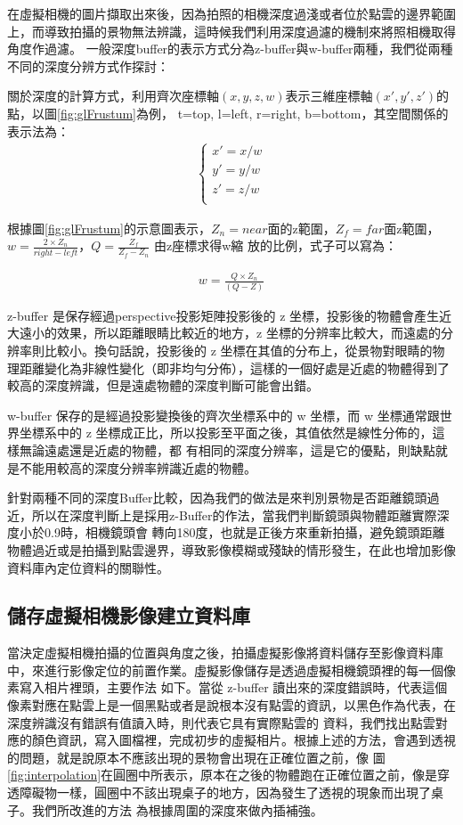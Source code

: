 	在虛擬相機的圖片擷取出來後，因為拍照的相機深度過淺或者位於點雲的邊界範圍上，而導致拍攝的景物無法辨識，這時候我們利用深度過濾的機制來將照相機取得角度作過濾。
	一般深度buffer的表示方式分為z-buffer與w-buffer兩種，我們從兩種不同的深度分辨方式作探討：
	
	關於深度的計算方式，利用齊次座標軸$(x,y,z,w)$表示三維座標軸$(x',y',z')$的點，以圖\ref{fig:glFrustum}為例，
	t=top, l=left, r=right, b=bottom，其空間關係的表示法為：
	\begin{align}
		\left\{
		\begin{array}{ccc}
		x' = x /w \\
		y' = y /w \\
		z' = z /w \\
		\end{array}
		\right.
	\end{align}
	
	根據圖\ref{fig:glFrustum}的示意圖表示，$Z_n = near$面的z範圍，$Z_f = far$面z範圍，$w = \frac{2 \times Z_n}{right-left}$，$Q = \frac{Z_f}{Z_f - Z_n}$ 由z座標求得w縮
	放的比例，式子可以寫為：
		
	\begin{align}
		w = \frac{Q\times Z_n}{(Q-Z)}
	\end{align}			
	
	z-buffer 是保存經過perspective投影矩陣投影後的 z 坐標，投影後的物體會產生近大遠小的效果，所以距離眼睛比較近的地方，z 坐標的分辨率比較大，而遠處的分辨率則比較小。換句話說，投影後的
    z 坐標在其值的分布上，從景物對眼睛的物理距離變化為非線性變化（即非均勻分佈），這樣的一個好處是近處的物體得到了較高的深度辨識，但是遠處物體的深度判斷可能會出錯。 
    
    w-buffer 保存的是經過投影變換後的齊次坐標系中的 w 坐標，而 w 坐標通常跟世界坐標系中的 z 坐標成正比，所以投影至平面之後，其值依然是線性分佈的，這樣無論遠處還是近處的物體，都
    有相同的深度分辨率，這是它的優點，則缺點就是不能用較高的深度分辨率辨識近處的物體。
    
    針對兩種不同的深度Buffer比較，因為我們的做法是來判別景物是否距離鏡頭過近，所以在深度判斷上是採用z-Buffer的作法，當我們判斷鏡頭與物體距離實際深度小於0.9時，相機鏡頭會
    轉向180度，也就是正後方來重新拍攝，避免鏡頭距離物體過近或是拍攝到點雲邊界，導致影像模糊或殘缺的情形發生，在此也增加影像資料庫內定位資料的關聯性。

\subsection{儲存虛擬相機影像建立資料庫}
%
	當決定虛擬相機拍攝的位置與角度之後，拍攝虛擬影像將資料儲存至影像資料庫中，來進行影像定位的前置作業。虛擬影像儲存是透過虛擬相機鏡頭裡的每一個像素寫入相片裡頭，主要作法
	如下。當從 z-buffer 讀出來的深度錯誤時，代表這個像素對應在點雲上是一個黑點或者是說根本沒有點雲的資訊，以黑色作為代表，在深度辨識沒有錯誤有值讀入時，則代表它具有實際點雲的
	資料，我們找出點雲對應的顏色資訊，寫入圖檔裡，完成初步的虛擬相片。根據上述的方法，會遇到透視的問題，就是說原本不應該出現的景物會出現在正確位置之前，像
	圖\ref{fig:interpolation}在圓圈中所表示，原本在之後的物體跑在正確位置之前，像是穿透障礙物一樣，圓圈中不該出現桌子的地方，因為發生了透視的現象而出現了桌子。我們所改進的方法
	為根據周圍的深度來做內插補強。
	
